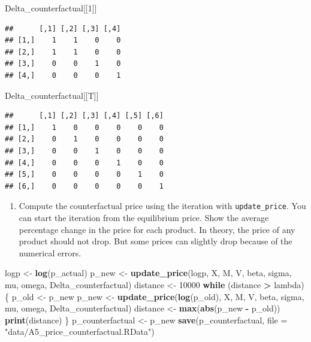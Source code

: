 \documentclass[]{book}
\newenvironment{Shaded}{\begin{snugshade}}{\end{snugshade}}
\newcommand{\KeywordTok}[1]{\textcolor[rgb]{0.13,0.29,0.53}{\textbf{#1}}}
\newcommand{\DataTypeTok}[1]{\textcolor[rgb]{0.13,0.29,0.53}{#1}}
\newcommand{\DecValTok}[1]{\textcolor[rgb]{0.00,0.00,0.81}{#1}}
\newcommand{\StringTok}[1]{\textcolor[rgb]{0.31,0.60,0.02}{#1}}
\newcommand{\ControlFlowTok}[1]{\textcolor[rgb]{0.13,0.29,0.53}{\textbf{#1}}}
\newcommand{\OperatorTok}[1]{\textcolor[rgb]{0.81,0.36,0.00}{\textbf{#1}}}
\newcommand{\NormalTok}[1]{#1}
\providecommand{\tightlist}{%
  \setlength{\itemsep}{0pt}\setlength{\parskip}{0pt}}
\begin{document}
\begin{Shaded}
\begin{Highlighting}[]
\NormalTok{Delta_counterfactual[[}\DecValTok{1}\NormalTok{]]}
\end{Highlighting}
\end{Shaded}

\begin{verbatim}
##      [,1] [,2] [,3] [,4]
## [1,]    1    1    0    0
## [2,]    1    1    0    0
## [3,]    0    0    1    0
## [4,]    0    0    0    1
\end{verbatim}

\begin{Shaded}
\begin{Highlighting}[]
\NormalTok{Delta_counterfactual[[T]]}
\end{Highlighting}
\end{Shaded}

\begin{verbatim}
##      [,1] [,2] [,3] [,4] [,5] [,6]
## [1,]    1    0    0    0    0    0
## [2,]    0    1    0    0    0    0
## [3,]    0    0    1    0    0    0
## [4,]    0    0    0    1    0    0
## [5,]    0    0    0    0    1    0
## [6,]    0    0    0    0    0    1
\end{verbatim}

\begin{enumerate}
\def\labelenumi{\arabic{enumi}.}
\setcounter{enumi}{1}
\tightlist
\item
  Compute the counterfactual price using the iteration with
  \texttt{update\_price}. You can start the iteration from the
  equilibrium price. Show the average percentage change in the price for
  each product. In theory, the price of any product should not drop. But
  some prices can slightly drop because of the numerical errors.
\end{enumerate}

\begin{Shaded}
\begin{Highlighting}[]
\NormalTok{logp <-}\StringTok{ }\KeywordTok{log}\NormalTok{(p_actual)}
\NormalTok{p_new <-}\StringTok{ }\KeywordTok{update_price}\NormalTok{(logp, X, M, V, beta, sigma, mu, omega, Delta_counterfactual)}
\NormalTok{distance <-}\StringTok{ }\DecValTok{10000}
\ControlFlowTok{while}\NormalTok{ (distance }\OperatorTok{>}\StringTok{ }\NormalTok{lambda) \{}
\NormalTok{  p_old <-}\StringTok{ }\NormalTok{p_new}
\NormalTok{  p_new <-}\StringTok{ }\KeywordTok{update_price}\NormalTok{(}\KeywordTok{log}\NormalTok{(p_old), X, M, V, beta, sigma, mu, omega, Delta_counterfactual)}
\NormalTok{  distance <-}\StringTok{ }\KeywordTok{max}\NormalTok{(}\KeywordTok{abs}\NormalTok{(p_new }\OperatorTok{-}\StringTok{ }\NormalTok{p_old))}
  \KeywordTok{print}\NormalTok{(distance)}
\NormalTok{\}}
\NormalTok{p_counterfactual <-}\StringTok{ }\NormalTok{p_new}
\KeywordTok{save}\NormalTok{(p_counterfactual, }\DataTypeTok{file =} \StringTok{"data/A5_price_counterfactual.RData"}\NormalTok{)}
\end{Highlighting}
\end{Shaded}
\end{document}
